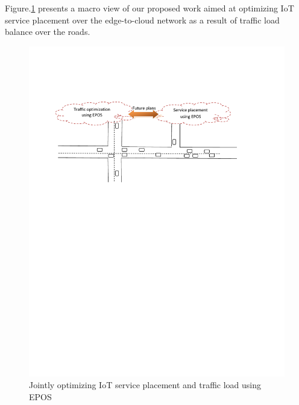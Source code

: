 \documentclass[twocolumn]{article}
\begin{document}
\par Figure.\ref{fig:go} presents a macro view of our proposed work aimed at optimizing IoT service placement over the edge-to-cloud network as a result of traffic load balance over the roads.

\begin{figure}[!htbp]
\centering
\includegraphics[clip, trim=2.1cm 17.8cm 4.2cm 4.1cm, width=\columnwidth]{figures/pdf/Macro-view.pdf}
\caption{Jointly optimizing IoT service placement and traffic load using EPOS}
\label{fig:go}
\end{figure}
\end{document}
